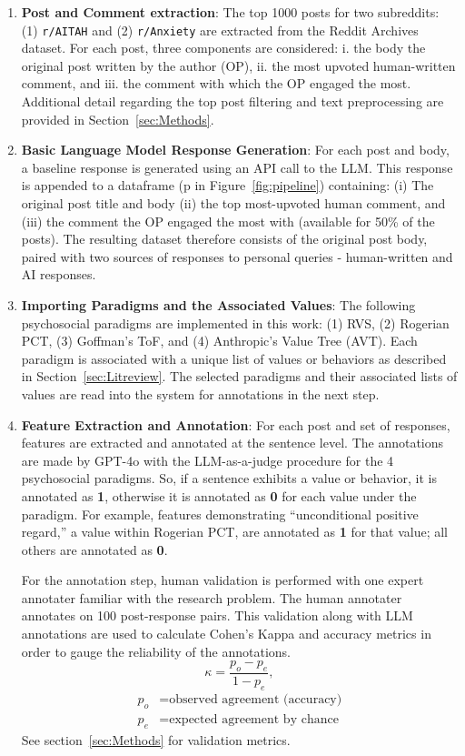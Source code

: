 \begin{enumerate}\label{pipeline_steps}
    \item \textbf{Post and Comment extraction}: The top 1000 posts for two subreddits: (1) \texttt{r/AITAH} and (2) \texttt{r/Anxiety} are extracted from the Reddit Archives dataset. For each post, three components are considered: i. the body the original post written by the author (OP), ii. the most upvoted human-written comment, and iii. the comment with which the OP engaged the most. Additional detail regarding the top post filtering and text preprocessing are provided in Section~\ref{sec:Methods}.
    \item \textbf{Basic Language Model Response Generation}: For each post and body, a baseline response is generated using an API call to the LLM. This response is appended to a dataframe (p in Figure~\ref{fig:pipeline}) containing: (i) The original post title and body (ii) the top most-upvoted human comment, and (iii) the comment the OP engaged the most with (available for 50\% of the posts). The resulting dataset therefore consists of the original post body, paired with two sources of responses to personal queries - human-written and AI responses.
    \item \textbf{Importing Paradigms and the Associated Values}: The following psychosocial paradigms are implemented in this work: (1) RVS, (2) Rogerian PCT, (3) Goffman’s ToF, and (4) Anthropic’s Value Tree (AVT). 
    Each paradigm is associated with a unique list of values or behaviors as described in Section~\ref{sec:Litreview}. The selected paradigms and their associated lists of values are read into the system for annotations in the next step.
    \item \textbf{Feature Extraction and Annotation}: 
    For each post and set of responses, features are extracted and annotated at the sentence level.
    The annotations are made by GPT-4o with the LLM-as-a-judge \cite{zheng-et-al} procedure for the 4 psychosocial paradigms. So, if a sentence exhibits a value or behavior, it is annotated as \textbf{1}, otherwise it is annotated as \textbf{0} for each value under the paradigm. For example, features demonstrating “unconditional positive regard,” a value within Rogerian PCT, are annotated as \textbf{1} for that value; all others are annotated as \textbf{0}.

    For the annotation step, human validation is performed with one expert annotater familiar with the research problem. The human annotater annotates on 100 post-response pairs. This validation along with LLM annotations are used to calculate Cohen's Kappa and accuracy metrics in order to gauge the reliability of the annotations.
    \[
    \kappa = \frac{p_o - p_e}{1 - p_e},
    \]
    \[
    \begin{aligned}
    p_o &= \text{observed agreement (accuracy)} \\
    p_e &= \text{expected agreement by chance}
    \end{aligned}
    \]
    See section~\ref{sec:Methods} for validation metrics.


\end{enumerate}
